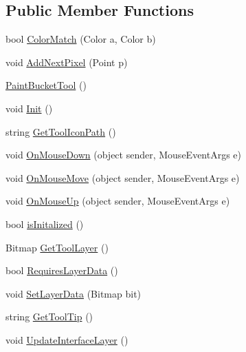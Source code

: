 \subsection*{Public Member Functions}
\begin{DoxyCompactItemize}
\item 
bool \mbox{\hyperlink{class_paint___program_1_1_paint_bucket_tool_a897f50631adb267c4b0a5e242c9bfaa5}{Color\+Match}} (Color a, Color b)
\item 
void \mbox{\hyperlink{class_paint___program_1_1_paint_bucket_tool_a9702953f92a727585a7d12507070963e}{Add\+Next\+Pixel}} (Point p)
\item 
\mbox{\hyperlink{class_paint___program_1_1_paint_bucket_tool_acff0d603cffb8e2b068e5ab74a63c9bd}{Paint\+Bucket\+Tool}} ()
\item 
void \mbox{\hyperlink{class_paint___program_1_1_paint_bucket_tool_a2de33717bdf3555d97e5e6e962602f85}{Init}} ()
\item 
string \mbox{\hyperlink{class_paint___program_1_1_paint_bucket_tool_aef69a21dec547869dde171a604bf1492}{Get\+Tool\+Icon\+Path}} ()
\item 
void \mbox{\hyperlink{class_paint___program_1_1_paint_bucket_tool_a468286c5eb5f2a49fe92387b9c859398}{On\+Mouse\+Down}} (object sender, Mouse\+Event\+Args e)
\item 
void \mbox{\hyperlink{class_paint___program_1_1_paint_bucket_tool_a0a4dfeb323d746b531ece7d4a9e218a7}{On\+Mouse\+Move}} (object sender, Mouse\+Event\+Args e)
\item 
void \mbox{\hyperlink{class_paint___program_1_1_paint_bucket_tool_a3841a712dff7c2887a4518d7602b627e}{On\+Mouse\+Up}} (object sender, Mouse\+Event\+Args e)
\item 
bool \mbox{\hyperlink{class_paint___program_1_1_paint_bucket_tool_ad41b8e00b3715186451c6caadc595db8}{is\+Initalized}} ()
\item 
Bitmap \mbox{\hyperlink{class_paint___program_1_1_paint_bucket_tool_a3167ad9df7812f1f857e0a869a455ff6}{Get\+Tool\+Layer}} ()
\item 
bool \mbox{\hyperlink{class_paint___program_1_1_paint_bucket_tool_a634df2c5ddde570dc6c73abe5c680266}{Requires\+Layer\+Data}} ()
\item 
void \mbox{\hyperlink{class_paint___program_1_1_paint_bucket_tool_ab2716c454849a952526e94c40bba90b6}{Set\+Layer\+Data}} (Bitmap bit)
\item 
string \mbox{\hyperlink{class_paint___program_1_1_paint_bucket_tool_af890852ac2b519cc0d2a7a767e09fe2d}{Get\+Tool\+Tip}} ()
\item 
void \mbox{\hyperlink{class_paint___program_1_1_paint_bucket_tool_ac1955b19a9fd31aaaca0bc07cef54957}{Update\+Interface\+Layer}} ()
\end{DoxyCompactItemize}
